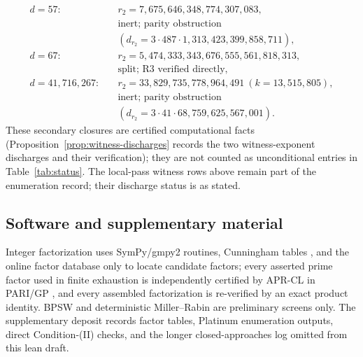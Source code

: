 \documentclass[11pt]{amsart}
\theoremstyle{plain}
\theoremstyle{definition}
\theoremstyle{remark}
\numberwithin{equation}{section}
\begin{document}
\[
  \begin{aligned}
  d=57:&\quad r_2=7{,}675{,}646{,}348{,}774{,}307{,}083,\\
       &\quad \text{inert; parity obstruction}\\
       &\quad (d_{r_2}=3\cdot487\cdot1{,}313{,}423{,}399{,}858{,}711),\\
  d=67:&\quad r_2=5{,}474{,}333{,}343{,}676{,}555{,}561{,}818{,}313,\\
       &\quad \text{split; R3 verified directly},\\
  d=41{,}716{,}267:&\quad r_2=33{,}829{,}735{,}778{,}964{,}491\ (k=13{,}515{,}805),\\
       &\quad \text{inert; parity obstruction}\\
       &\quad (d_{r_2}=3\cdot41\cdot68{,}759{,}625{,}567{,}001).
  \end{aligned}
\]
These secondary closures are certified computational facts (Proposition~\ref{prop:witness-discharges} records the two witness-exponent discharges and their verification); they are not counted as unconditional entries in Table~\ref{tab:status}. The local-pass witness rows above remain part of the enumeration record; their discharge status is as stated.

\subsection{Software and supplementary material}\label{sec:toolchain}

Integer factorization uses SymPy/gmpy2 routines, Cunningham tables \cite{ref:Cunningham}, and the online factor database \cite{ref:FactorDB} only to locate candidate factors; every asserted prime factor used in finite exhaustion is independently certified by APR-CL in PARI/GP \cite{ref:CohenLenstra}, and every assembled factorization is re-verified by an exact product identity. BPSW and deterministic Miller--Rabin are preliminary screens only. The supplementary deposit records factor tables, Platinum enumeration outputs, direct Condition-(II) checks, and the longer closed-approaches log omitted from this lean draft.
\end{document}
